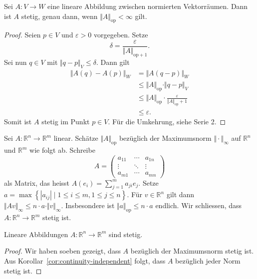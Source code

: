 \documentclass[../main.tex]{subfiles}
\begin{document}
\begin{proposition}
  Sei $A \colon V \to W$ eine lineare Abbildung zwischen
  normierten Vektorräumen.
  Dann ist $A$ stetig, genau dann, wenn
  $\Vert A \Vert_\text{op} < \infty$ gilt.
\end{proposition}

\begin{proof}
Seien $p \in V$ und $\varepsilon > 0$ 
vorgegeben.
Setze
\[
  \delta = \frac{\varepsilon}{\Vert A \Vert_{\text{op} + 1}}.
\]
Sei nun $q \in V$ mit $\Vert q - p \Vert_V \leq \delta$.
Dann gilt
\begin{align*}
  \Vert A(q) - A(p) \Vert_W
  & = \Vert A(q- p)\Vert_W\\
  &\leq \Vert A \Vert_\text{op} \cdot \Vert q - p \Vert_V \\
  & \leq \Vert A \Vert_{\text{op}} \cdot
  \frac{\varepsilon}{\Vert A \Vert_{\text{op}} + 1} \\
  &\leq \varepsilon.
\end{align*}
Somit ist $A$ stetig im Punkt $p \in V$.
Für die Umkehrung, siehe Serie 2.
\end{proof}
  
\begin{specialcase}
  Sei $A \colon \mathbb{R}^n \to \mathbb{R}^m$ linear.
  Schätze $\Vert A \Vert_{\text{op}}$ bezüglich
  der Maximumsnorm $\Vert \cdot \Vert_{\infty}$ auf
  $\mathbb{R}^n$ und $\mathbb{R}^m$ wie folgt ab.
  Schreibe
  \[
    A = 
    \begin{pmatrix}
      a_{11} & \cdots & a_{1n} \\
      \vdots & \ddots & \vdots \\
      a_{m1} & \cdots & a_{mn}
    \end{pmatrix}
  \]
  als Matrix, das heisst $A(e_i) = \sum_{j=1}^{m} a_{ji}e_j$.
  Setze $a = \max \left\{|a_{ij}| \mid 
  1 \leq i \leq m, 1 \leq j \leq n\right\}$.
  Für $v \in \mathbb{R}^{n}$ gilt dann
  \(
    \Vert Av \Vert_\infty \leq n \cdot a \cdot \Vert v \Vert_{\infty}.
  \)
  Insbesondere ist $\Vert a \Vert_{\text{op}} \leq n \cdot a$ endlich.
  Wir schliessen, dass $A \colon \mathbb{R}^n \to \mathbb{R}^m$ stetig ist.
\end{specialcase}

\begin{corollary}
  Lineare Abbildungen $A \colon \mathbb{R}^n \to \mathbb{R}^m$ sind stetig.
\end{corollary}

\begin{proof}
  Wir haben soeben gezeigt, dass $A$ bezüglich der Maximumsnorm stetig ist.
  Aus Korollar~\ref{cor:continuity-independent} folgt, dass
  $A$ bezüglich jeder Norm stetig ist.
\end{proof}
\end{document}
